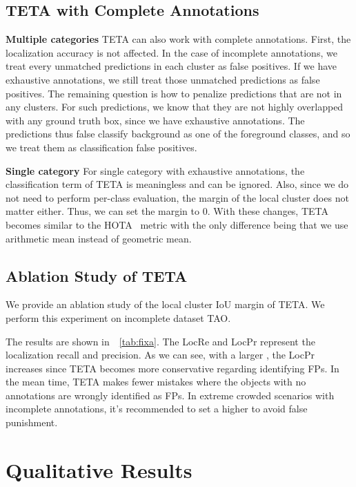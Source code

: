 \documentclass[runningheads]{llncs}
\newcommand{\parsection}[1]{\vspace{1mm}\noindent\textbf{#1 }}
\begin{document}
\subsection{TETA with Complete Annotations}

\parsection{Multiple categories}
TETA can also work with complete annotations. First, the localization accuracy is not affected.
In the case of incomplete annotations, we treat every unmatched predictions in each cluster as false positives.
If we have exhaustive annotations, we still treat those unmatched predictions as false positives.
The remaining question is how to penalize predictions that are not in any clusters.
For such predictions,
we know that they are not highly overlapped with any ground truth box, since we have exhaustive annotations.
The predictions thus false classify background as one of the foreground classes,
and so we treat them as classification false positives.

\parsection{Single category}
For single category with exhaustive annotations, the classification term of TETA is meaningless and can be ignored.
Also, since we do not need to perform per-class evaluation, the margin of the local cluster does not matter either.
Thus, we can set the margin  to 0.
With these changes, TETA becomes similar to the HOTA~\cite{hota} metric with the only difference being that we use arithmetic mean instead of geometric mean.


\subsection{Ablation Study of TETA}

We provide an ablation study of the local cluster IoU margin  of TETA. We perform this experiment on incomplete dataset TAO.

The results are shown in~\tablename~\ref{tab:fixa}. The LocRe and LocPr represent the localization recall and precision. As we can see, with a larger , the LocPr increases since TETA becomes more conservative regarding identifying FPs. In the mean time, TETA makes fewer mistakes where the objects with no annotations are wrongly identified as FPs. In extreme crowded scenarios with incomplete annotations, it's recommended to set a higher  to avoid false punishment.



\section{Qualitative Results}
\end{document}
